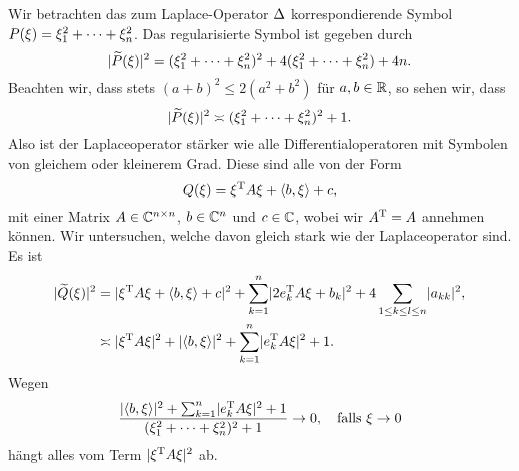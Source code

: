 \begin{exa}\label{exa:lap}
Wir betrachten das zum Laplace-Operator $\Delta$
korrespondierende Symbol $P(\xi)=\xi_1^2+\dots+\xi_n^2$.
Das regularisierte Symbol ist gegeben durch
\begin{equation}
\lvert\widetilde{P}(\xi)\rvert^2=(\xi^2_1+\dots+\xi^2_n)^2+4(\xi_1^2+\dots+\xi_n^2)+4n.
\end{equation}
Beachten wir, dass stets $(a+b)^2\leq2(a^2+b^2)$ für $a,b\in\mathbb R$,
so sehen wir, dass
\begin{equation}
\lvert\widetilde{P}(\xi)\rvert^2\asymp(\xi^2_1+\dots+\xi^2_n)^2+1.
\end{equation}
Also ist der Laplaceoperator stärker wie alle Differentialoperatoren
mit Symbolen von gleichem oder kleinerem Grad.
Diese sind alle von der Form
\begin{equation}
Q(\xi)=\xi^{\mathrm{T}} A\xi+\langle b,\xi\rangle+c,
\end{equation}
mit einer Matrix $A\in\mathbb C^{n\times n}$, $b\in\mathbb C^n$ und $c\in\mathbb C$,
wobei wir $A^{\mathrm{T}}=A$ annehmen können.
Wir untersuchen, welche davon gleich stark wie der Laplaceoperator sind.
Es ist
\begin{align}
\lvert\widetilde{Q}(\xi)\rvert^2&=\lvert\xi^{\mathrm{T}} A\xi+\langle b,\xi\rangle+c\rvert^2+\sum_{k=1}^n\lvert2e^{\mathrm{T}}_kA\xi+b_k\rvert^2
+4\sum_{1\leq k\leq l\leq n}\lvert a_{kk}\rvert^2,\\
&\asymp\lvert\xi^{\mathrm{T}} A\xi\rvert^2+\lvert\langle b,\xi\rangle\rvert^2+\sum_{k=1}^n\lvert e^{\mathrm{T}}_kA\xi\rvert^2+1.
\end{align}
Wegen
\begin{equation}
\frac{\lvert\langle b,\xi\rangle\rvert^2+\sum_{k=1}^n\lvert e^{\mathrm{T}}_kA\xi\rvert^2+1}{(\xi^2_1+\dots+\xi^2_n)^2+1}\to0,
\quad\text{falls}~\xi\to0
\end{equation}
hängt alles vom Term $\lvert\xi^{\mathrm{T}} A\xi\rvert^2$ ab.
\end{exa}

